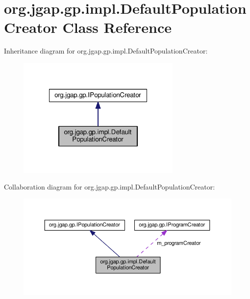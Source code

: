 \hypertarget{classorg_1_1jgap_1_1gp_1_1impl_1_1_default_population_creator}{\section{org.\-jgap.\-gp.\-impl.\-Default\-Population\-Creator Class Reference}
\label{classorg_1_1jgap_1_1gp_1_1impl_1_1_default_population_creator}
}


Inheritance diagram for org.\-jgap.\-gp.\-impl.\-Default\-Population\-Creator\-:
\nopagebreak
\begin{figure}[H]
\begin{center}
\leavevmode
\includegraphics[width=228pt]{classorg_1_1jgap_1_1gp_1_1impl_1_1_default_population_creator__inherit__graph}
\end{center}
\end{figure}


Collaboration diagram for org.\-jgap.\-gp.\-impl.\-Default\-Population\-Creator\-:
\nopagebreak
\begin{figure}[H]
\begin{center}
\leavevmode
\includegraphics[width=350pt]{classorg_1_1jgap_1_1gp_1_1impl_1_1_default_population_creator__coll__graph}
\end{center}
\end{figure}
